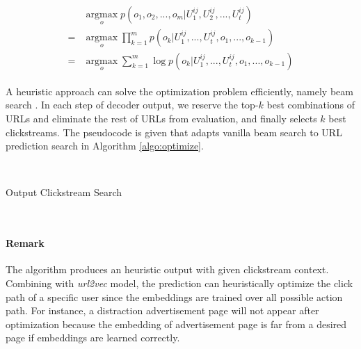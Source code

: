 \begin{align}
\label{eqn:optimize}
\begin{split}
    & \operatorname*{argmax}_{o} p( o_1, o_2, ..., o_{m} | U^{ij}_1, U^{ij}_2, ..., U^{ij}_t ) \\
   =& \operatorname*{argmax}_{o} \prod_{k=1}^{m} p(o_{k} | U^{ij}_1, ..., U^{ij}_t, o_1, ..., o_{k-1}) \\
   =& \operatorname*{argmax}_{o} \sum_{k=1}^{m} \log p(o_{k} | U^{ij}_1, ..., U^{ij}_t, o_1, ..., o_{k-1})
\end{split}
\end{align}

A heuristic approach can solve the optimization problem efficiently, namely beam search 
\cite{DBLP:journals/corr/abs-1211-3711}.
In each step of decoder output, we reserve the top-$k$ best combinations of URLs and 
eliminate the rest of URLs from evaluation, and finally selects $k$ best clickstreams.
The pseudocode is given that adapts vanilla beam search to URL prediction search 
in Algorithm \ref{algo:optimize}.

~\\

\begin{algorithm}[H]
\label{algo:optimize}
\SetAlgoLined
{}
\caption{Output Clickstream Search}
\end{algorithm}

~\\

\paragraph{Remark} The algorithm produces an heuristic output 
with given clickstream context. Combining with \emph{url2vec} model, the prediction
can heuristically optimize the click path of a specific user since the embeddings are trained 
over all possible action path. For instance, a distraction advertisement page will not appear
after optimization because the embedding of advertisement page is far from a desired page
if embeddings are learned correctly.


\cleardoublepage